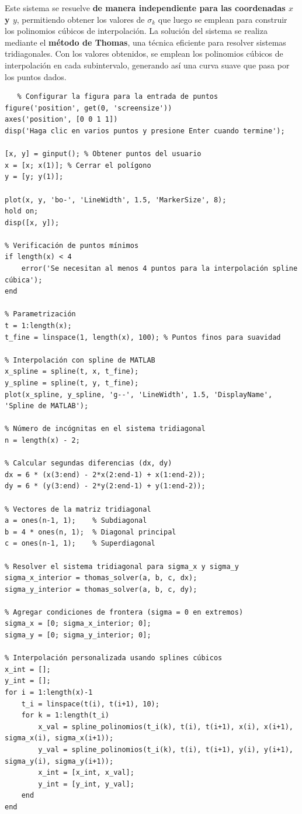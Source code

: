\begin{homeworkProblem}
\begin{solucion}
Este sistema se resuelve \textbf{de manera independiente para las coordenadas $x$ y $y$}, permitiendo obtener los valores de $\sigma_k$ que luego se emplean para construir los polinomios cúbicos de interpolación. La solución del sistema se realiza mediante el \textbf{método de Thomas}, una técnica eficiente para resolver sistemas tridiagonales. Con los valores obtenidos, se emplean los polinomios cúbicos de interpolación en cada subintervalo, generando así una curva suave que pasa por los puntos dados.


\begin{lstlisting}
   % Configurar la figura para la entrada de puntos
figure('position', get(0, 'screensize'))
axes('position', [0 0 1 1])
disp('Haga clic en varios puntos y presione Enter cuando termine');

[x, y] = ginput(); % Obtener puntos del usuario
x = [x; x(1)]; % Cerrar el polígono
y = [y; y(1)];

plot(x, y, 'bo-', 'LineWidth', 1.5, 'MarkerSize', 8);
hold on;
disp([x, y]);

% Verificación de puntos mínimos
if length(x) < 4
    error('Se necesitan al menos 4 puntos para la interpolación spline cúbica');
end

% Parametrización
t = 1:length(x);
t_fine = linspace(1, length(x), 100); % Puntos finos para suavidad

% Interpolación con spline de MATLAB
x_spline = spline(t, x, t_fine);
y_spline = spline(t, y, t_fine);
plot(x_spline, y_spline, 'g--', 'LineWidth', 1.5, 'DisplayName', 'Spline de MATLAB');

% Número de incógnitas en el sistema tridiagonal
n = length(x) - 2;

% Calcular segundas diferencias (dx, dy)
dx = 6 * (x(3:end) - 2*x(2:end-1) + x(1:end-2));
dy = 6 * (y(3:end) - 2*y(2:end-1) + y(1:end-2));

% Vectores de la matriz tridiagonal
a = ones(n-1, 1);    % Subdiagonal
b = 4 * ones(n, 1);  % Diagonal principal
c = ones(n-1, 1);    % Superdiagonal

% Resolver el sistema tridiagonal para sigma_x y sigma_y
sigma_x_interior = thomas_solver(a, b, c, dx);
sigma_y_interior = thomas_solver(a, b, c, dy);

% Agregar condiciones de frontera (sigma = 0 en extremos)
sigma_x = [0; sigma_x_interior; 0];
sigma_y = [0; sigma_y_interior; 0];

% Interpolación personalizada usando splines cúbicos
x_int = [];
y_int = [];
for i = 1:length(x)-1
    t_i = linspace(t(i), t(i+1), 10);
    for k = 1:length(t_i)
        x_val = spline_polinomios(t_i(k), t(i), t(i+1), x(i), x(i+1), sigma_x(i), sigma_x(i+1));
        y_val = spline_polinomios(t_i(k), t(i), t(i+1), y(i), y(i+1), sigma_y(i), sigma_y(i+1));
        x_int = [x_int, x_val];
        y_int = [y_int, y_val];
    end
end


\end{lstlisting}
\end{solucion}
\end{homeworkProblem}
